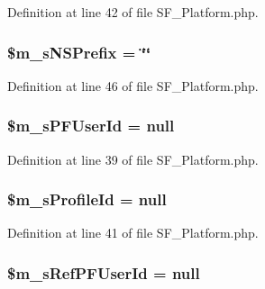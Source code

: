 Definition at line 42 of file SF\_\-Platform.php.

\hypertarget{classSF__Platform_afe554572420154a2cf6d9ab5049abe55}{
\subsubsection[{\$m\_\-sNSPrefix}]{\setlength{\rightskip}{0pt plus 5cm}\$m\_\-sNSPrefix = \char`\"{}\char`\"{}}}
\label{classSF__Platform_afe554572420154a2cf6d9ab5049abe55}


Definition at line 46 of file SF\_\-Platform.php.

\hypertarget{classSF__Platform_aca2665de105ba9e1a89b58722bd21f16}{
\subsubsection[{\$m\_\-sPFUserId}]{\setlength{\rightskip}{0pt plus 5cm}\$m\_\-sPFUserId = null}}
\label{classSF__Platform_aca2665de105ba9e1a89b58722bd21f16}


Definition at line 39 of file SF\_\-Platform.php.

\hypertarget{classSF__Platform_a935f137fe74f4707be2d81593c3a624d}{
\subsubsection[{\$m\_\-sProfileId}]{\setlength{\rightskip}{0pt plus 5cm}\$m\_\-sProfileId = null}}
\label{classSF__Platform_a935f137fe74f4707be2d81593c3a624d}


Definition at line 41 of file SF\_\-Platform.php.

\hypertarget{classSF__Platform_ae91a01f7cb3d6446617f9e6cae69533c}{
\subsubsection[{\$m\_\-sRefPFUserId}]{\setlength{\rightskip}{0pt plus 5cm}\$m\_\-sRefPFUserId = null}}
\label{classSF__Platform_ae91a01f7cb3d6446617f9e6cae69533c}


